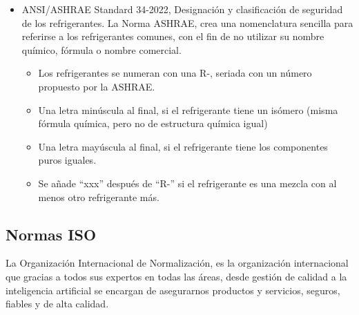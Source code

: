 \begin{itemize}
	\item ANSI/ASHRAE Standard 34-2022, Designación y clasificación de seguridad de los refrigerantes.
	La Norma ASHRAE, crea una nomenclatura sencilla para referirse a los refrigerantes comunes, con el fin de no utilizar su nombre químico, fórmula o nombre comercial.
	 \begin{itemize}
	 
	 
	\item Los refrigerantes se numeran con una R-, seriada con un número propuesto por la ASHRAE.
	\item Una letra minúscula al final, si el refrigerante tiene un isómero (misma fórmula química, pero no de estructura química igual)
	\item Una letra mayúscula al final, si el refrigerante tiene los componentes puros iguales.
	\item Se añade “xxx” después de “R-” si el refrigerante es una mezcla con al menos otro refrigerante más. 
\end{itemize}
\end{itemize}


\subsection{Normas ISO}

La Organización Internacional de Normalización, es la organización internacional que gracias a todos sus expertos en todas las áreas, desde gestión de calidad a la inteligencia artificial se encargan de asegurarnos productos y servicios, seguros, fiables y de alta calidad.

